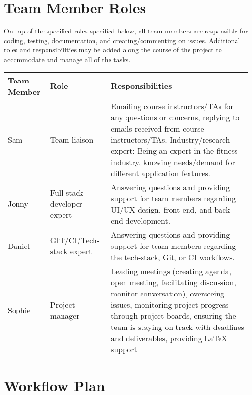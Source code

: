 \documentclass{article}
\begin{document}
	\section{Team Member Roles}

	On top of the specified roles specified below, all team members are responsible for coding, testing, documentation, and creating/commenting on issues. Additional roles and responsibilities may be added along the course of the project to accommodate and manage all of the tasks.

	\vspace{0.5cm}
	\begin{tabularx}{\textwidth}{|l|l|X|}
		\hline
		\textbf{Team Member} & \textbf{Role} & \textbf{Responsibilities} \\
		\hline
		Sam & Team liaison & Emailing course instructors/TAs for any questions or concerns, replying to emails received from course instructors/TAs. Industry/research expert: Being an expert in the fitness industry, knowing needs/demand for different application features. \\
		\hline
		Jonny & Full-stack developer expert & Answering questions and providing support for team members regarding UI/UX design, front-end, and back-end development. \\
		\hline
		Daniel & GIT/CI/Tech-stack expert & Answering questions and providing support for team members regarding the tech-stack, Git, or CI workflows. \\
		\hline
		Sophie & Project manager & Leading meetings (creating agenda, open meeting, facilitating discussion, monitor conversation), overseeing issues, monitoring project progress through project boards, ensuring the team is staying on track with deadlines and deliverables, providing LaTeX support\\
		\hline
	\end{tabularx}

	\section{Workflow Plan}
\end{document}
